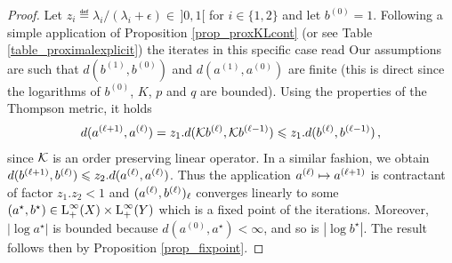 \begin{proof}
Let $z_i \eqdef \lambda_i/(\lambda_i + \epsilon) \in \, ]0,1[$ for $i\in\{1,2\}$ and let $b^{(0)}= 1$. Following a simple application of Proposition \ref{prop_proxKLcont} (or see Table
\ref{table_proximalexplicit}) the iterates in this specific case read 
%
Our assumptions are such that $d(b^{(1)},b^{(0)})$ and $d(a^{(1)},a^{(0)})$ are finite (this is direct since the logarithms of $b^{(0)}$, $K$, $p$ and $q$ are bounded).
%
Using the properties of the Thompson metric, it holds
\begin{eqnarray*}
d( a^{(\ell+1)},a^{(\ell)}) 
= z_1. d(\mathcal{K} b^{(\ell)}, \mathcal{K} b^{(\ell-1)} ) 
 \leqslant z_1. d(b^{(\ell)},b^{(\ell-1)}) \, ,
\end{eqnarray*}
since $\mathcal{K}$ is an order preserving linear operator. In a similar fashion, we obtain $d(b^{(\ell+1)},b^{(\ell)}) \leqslant z_2. d(a^{(\ell)},a^{(\ell)})$. Thus the application $a^{(\ell)} \mapsto a^{(\ell+1)}$ is contractant of factor $z_1.z_2 <1$ and $(a^{(\ell)}, b^{(\ell)})_{\ell}$ converges linearly to some $(a^\star,b^\star) \in \text{\upshape L}^\infty_+(X) \times \text{\upshape L}^\infty_+(Y)$ which is a fixed point of the iterations.
% 
Moreover, $|\log a^\star|$ is bounded because $d(a^{(0)},a^\star)<\infty$, and so is $|\log b^\star|$.
The result follows then by Proposition \ref{prop_fixpoint}.
\end{proof}


